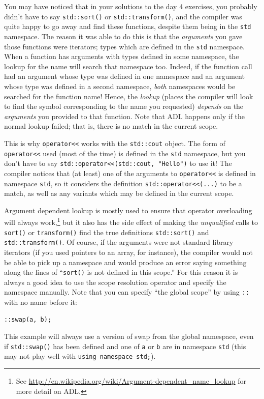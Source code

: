\documentclass[a4paper]{scrartcl}
\begin{document}
You may have noticed that in your solutions to the day 4 exercises, you probably didn't have to say \verb|std::sort()| or \verb|std::transform()|, and the compiler was quite happy to go away and find these functions, despite them being in the \verb|std| namespace. The reason it was able to do this is that the \emph{arguments} you gave those functions were iterators; types which are defined in the \verb|std| namespace. When a function has arguments with types defined in some namespace, the lookup for the name will search that namespace too. Indeed, if the function call had an argument whose type was defined in one namespace and an argument whose type was defined in a second namespace, \emph{both} namespaces would be searched for the function name! Hence, the \emph{lookup} (places the compiler will look to find the symbol corresponding to the name you requested) \emph{depends} on the \emph{arguments} you provided to that function. Note that ADL happens only if the normal lookup failed; that is, there is no match in the current scope.

This is why \verb|operator<<| works with the \verb|std::cout| object. The form of \verb|operator<<| used (most of the time) is defined in the \verb|std| namespace, but you don't have to say \verb|std::operator<<(std::cout, "Hello")| to use it! The compiler notices that (at least) one of the arguments to \verb|operator<<| is defined in namespace \verb|std|, so it considers the definition \verb|std::operator<<(...)| to be a match, as well as any variants which may be defined in the current scope.

Argument dependent lookup is mostly used to ensure that operator overloading will always work,\footnote{See \url{http://en.wikipedia.org/wiki/Argument-dependent_name_lookup} for more detail on ADL.} but it also has the side effect of making the \emph{unqualified} calls to \verb|sort()| or \verb|transform()| find the true definitions \verb|std::sort()| and \verb|std::transform()|. Of course, if the arguments were not standard library iterators (if you used pointers to an array, for instance), the compiler would not be able to pick up a namespace and would produce an error saying something along the lines of ``\verb|sort()| is not defined in this scope.'' For this reason it is always a good idea to use the scope resolution operator and specify the namespace manually. Note that you can specify ``the global scope'' by using \verb|::| with no name before it:
\begin{verbatim}
::swap(a, b);
\end{verbatim}
This example will always use a version of swap from the global namespace, even if \verb|std::swap()| has been defined and one of \verb|a| or \verb|b| are in namespace \verb|std| (this may not play well with \texttt{using namespace std;}).
\end{document}
